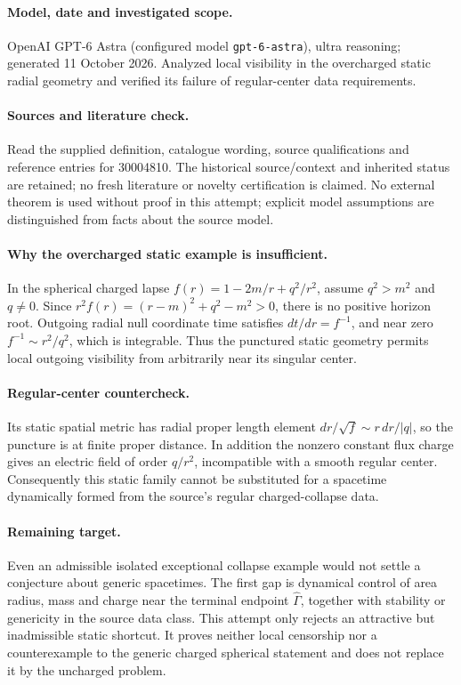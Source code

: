 \documentclass[11pt]{article}
\begin{document}
\paragraph{Model, date and investigated scope.}
OpenAI GPT-6 Astra (configured model \texttt{gpt-6-astra}), ultra reasoning; generated 11 October 2026. Analyzed local visibility in the overcharged static radial geometry and verified its failure of regular-center data requirements.

\paragraph{Sources and literature check.}
Read the supplied definition, catalogue wording, source qualifications and reference entries for 30004810. The historical source/context and inherited status are retained; no fresh literature or novelty certification is claimed. No external theorem is used without proof in this attempt; explicit model assumptions are distinguished from facts about the source model.

\paragraph{Why the overcharged static example is insufficient.} In the spherical charged lapse \(f(r)=1-2m/r+q^2/r^2\), assume \(q^2>m^2\) and \(q\ne0\). Since \(r^2f(r)=(r-m)^2+q^2-m^2>0\), there is no positive horizon root. Outgoing radial null coordinate time satisfies \(dt/dr=f^{-1}\), and near zero \(f^{-1}\sim r^2/q^2\), which is integrable. Thus the punctured static geometry permits local outgoing visibility from arbitrarily near its singular center.
\paragraph{Regular-center countercheck.} Its static spatial metric has radial proper length element \(dr/\sqrt f\sim r\,dr/|q|\), so the puncture is at finite proper distance. In addition the nonzero constant flux charge gives an electric field of order \(q/r^2\), incompatible with a smooth regular center. Consequently this static family cannot be substituted for a spacetime dynamically formed from the source's regular charged-collapse data.
\paragraph{Remaining target.} Even an admissible isolated exceptional collapse example would not settle a conjecture about generic spacetimes. The first gap is dynamical control of area radius, mass and charge near the terminal endpoint \(\widehat\Gamma\), together with stability or genericity in the source data class. This attempt only rejects an attractive but inadmissible static shortcut. It proves neither local censorship nor a counterexample to the generic charged spherical statement and does not replace it by the uncharged problem.
\end{document}
